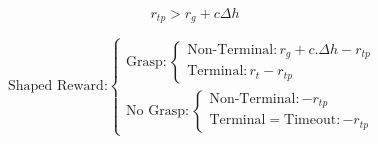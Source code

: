 \begin{equation}
 r_{tp} > r_g + c \Delta h
\end{equation}

\begin{equation}
    \text{Shaped Reward:}
    \begin{cases}
    \text{Grasp}: \begin{cases} \text{Non-Terminal} : r_g + c.\Delta h -r_{tp} \\ 	
                                \text{Terminal} : r_t - r_{tp}
    \end{cases} \\
    \text{No Grasp}: \begin{cases} \text{Non-Terminal} : -r_{tp}\\ 
                                    \text{Terminal}= \text{Timeout}: -r_{tp} 
    \end{cases}
    \end{cases}
\end{equation}